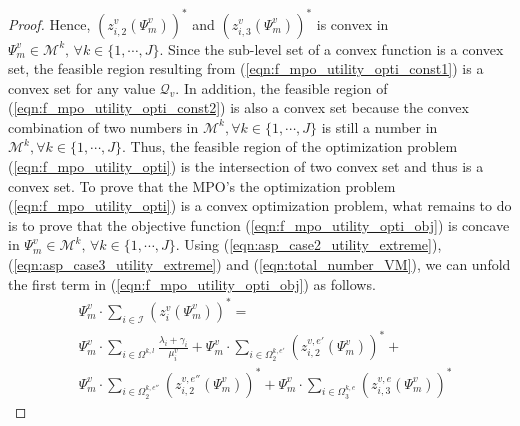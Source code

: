 \documentclass[conference]{IEEEtran}
\begin{document}
\begin{proof}
Hence, $(z_{i,2}^v(\Psi_m^v))^*$ and $(z_{i,3}^v(\Psi_m^v))^*$ is convex in $\Psi_m^v \in \mathcal{M}^k,\, \forall k \in \{1,\cdots, J\}$. Since the sub-level set of a convex function is a convex set, the feasible region resulting from (\ref{eqn:f_mpo_utility_opti_const1}) is a convex set for any value $\mathcal{Q}_v$. In addition, the feasible region of (\ref{eqn:f_mpo_utility_opti_const2}) is also a convex set because the convex combination of two numbers in $\mathcal{M}^k, \forall k \in \{1, \cdots, J\}$ is still a number in $\mathcal{M}^k, \forall k \in \{1, \cdots, J\}$. Thus, the feasible region of the optimization problem (\ref{eqn:f_mpo_utility_opti}) is the intersection of two convex set and thus is a convex set. To prove that the MPO's the optimization problem (\ref{eqn:f_mpo_utility_opti}) is a convex optimization problem, what remains to do is to prove that the objective function (\ref{eqn:f_mpo_utility_opti_obj}) is concave in $\Psi_m^v \in \mathcal{M}^k,\, \forall k \in \{1,\cdots, J\}$. Using (\ref{eqn:asp_case2_utility_extreme}), (\ref{eqn:asp_case3_utility_extreme}) and (\ref{eqn:total_number_VM}), we can unfold the first term in (\ref{eqn:f_mpo_utility_opti_obj}) as follows.
\begin{equation}\label{eqn:mpo_utility_first_term}
\begin{aligned}
&\Psi_m^v \cdot \sum_{i \in \mathcal{I}} (z_{i}^v(\Psi_m^v))^* = \\
&\Psi_m^v \cdot \sum_{i\in \Omega^{k,l}}\frac{\lambda_i + \gamma_i}{\mu_i^v}+
\Psi_m^v \cdot \sum_{i\in \Omega^{k,e'}_{2}}(z_{i,2}^{v,e'}(\Psi_m^v))^* + \\
&\Psi_m^v \cdot \sum_{i\in \Omega^{k,e''}_{2}}(z_{i,2}^{v,e''}(\Psi_m^v))^* + \Psi_m^v \cdot \sum_{i\in \Omega^{k,e}_{3}}(z_{i,3}^{v,e}(\Psi_m^v))^*
\end{aligned}   
\end{equation} 



\end{proof}
\end{document}
